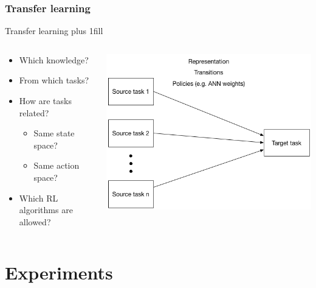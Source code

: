 \section{Transfer learning}
\begin{frame}[fragile]{Transfer learning}
\vskip0pt plus 1fill
\begin{columns}
\begin{column}{0.4\textwidth}
\begin{itemize}
    \item Which knowledge?
    \item From which tasks?
    \item How are tasks related?
    \begin{itemize}
        \item Same state space?
        \item Same action space?
    \end{itemize}
    \item Which RL algorithms are allowed?
\end{itemize}
\end{column}
    \begin{column}{0.6\textwidth}
    \includegraphics[width=\linewidth]{transfer_learning}
    \end{column}
\end{columns}
\begin{center}
\end{center}
\end{frame}

\part{Experiments}
